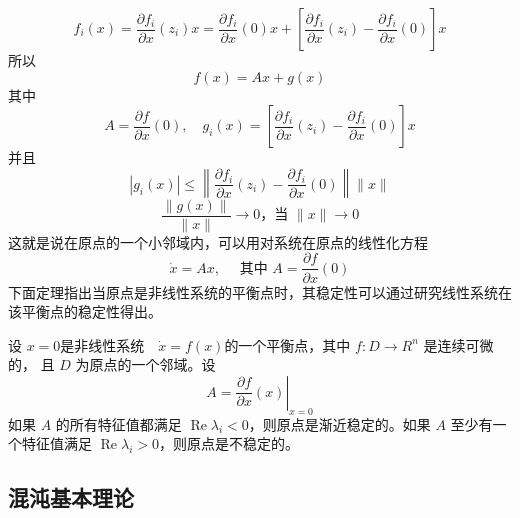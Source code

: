\begin{equation}
    f_i(x)=\frac{\partial f_i}{\partial x}\left(z_i\right) x=\frac{\partial f_i}{\partial x}(0) x+\left[\frac{\partial f_i}{\partial x}\left(z_i\right)-\frac{\partial f_i}{\partial x}(0)\right] x
\end{equation}
所以
\begin{equation}
    f(x)=A x+g(x)
\end{equation}
其中
\begin{equation}
    A=\frac{\partial f}{\partial x}(0),\quad g_i(x)=\left[\frac{\partial f_i}{\partial x}\left(z_i\right)-\frac{\partial f_i}{\partial x}(0)\right] x
\end{equation}
并且
\begin{equation}
    \left|g_i(x)\right| \leqslant\left\|\frac{\partial f_i}{\partial x}\left(z_i\right)-\frac{\partial f_i}{\partial x}(0)\right\|\|x\|
\end{equation}
\begin{equation}
    \frac{\|g(x)\|}{\|x\|} \rightarrow 0 \text {，当 }\|x\| \rightarrow 0
\end{equation}
这就是说在原点的一个小邻域内，可以用对系统在原点的线性化方程
\begin{equation}
    \dot{x}=A x,\quad \text { 其中 } A=\frac{\partial f}{\partial x}(0)
\end{equation}
下面定理指出当原点是非线性系统的平衡点时，其稳定性可以通过研究线性系统在该平衡点的稳定性得出。
\begin{theorem}
    设 $x=0$是非线性系统$\quad \dot{x}=f(x)$的一个平衡点，其中 $f: D \rightarrow R^n$ 是连续可微的，
    且 $D$ 为原点的一个邻域。设
    \begin{equation}
        A=\left.\frac{\partial f}{\partial x}(x)\right|_{x=0}
    \end{equation}
    如果 $A$ 的所有特征值都满足 $\operatorname{Re} \lambda_i<0$，则原点是渐近稳定的。如果 $A$ 至少有一个特征值满足 $\operatorname{Re} \lambda_i>0$，则原点是不稳定的。
\end{theorem}
\subsection{混沌基本理论}
